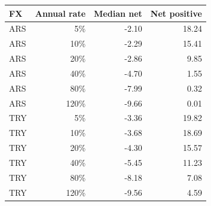 \begin{tabular}{lrrr}
\toprule
FX & Annual rate & Median net & Net positive \\
\midrule
ARS & 5\% & -2.10 & 18.24 \\
ARS & 10\% & -2.29 & 15.41 \\
ARS & 20\% & -2.86 & 9.85 \\
ARS & 40\% & -4.70 & 1.55 \\
ARS & 80\% & -7.99 & 0.32 \\
ARS & 120\% & -9.66 & 0.01 \\
TRY & 5\% & -3.36 & 19.82 \\
TRY & 10\% & -3.68 & 18.69 \\
TRY & 20\% & -4.30 & 15.57 \\
TRY & 40\% & -5.45 & 11.23 \\
TRY & 80\% & -8.18 & 7.08 \\
TRY & 120\% & -9.56 & 4.59 \\
\bottomrule
\end{tabular}
